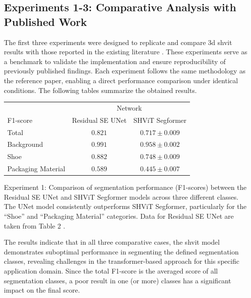 \subsection{Experiments 1-3: Comparative Analysis with Published Work}
The first three experiments were designed to replicate and compare \gls{3d} \gls{shvit} results with those reported in the existing literature \cite{contribution_martin_leipert}. These experiments serve as a benchmark to validate the implementation and ensure reproducibility of previously published findings. Each experiment follows the same methodology as the reference paper, enabling a direct performance comparison under identical conditions. The following tables summarize the obtained results.

\begin{center}
	\begin{threeparttable}[H]
		\begin{tabular}{lcc}
			\toprule[1.5pt]  
			& \multicolumn{2}{c}{Network} \\
			\multicolumn{1}{l}{F1-score} & {Residual SE UNet} & {SHViT Segformer} \\
			\midrule
			\midrule
			Total              & $0.821$ & $0.717 \pm 0.009$ \\
			\midrule
			Background         & $0.991$ & $0.958 \pm 0.002$ \\
			Shoe               & $0.882$ & $0.748 \pm 0.009$ \\
			Packaging Material & $0.589$ & $0.445 \pm 0.007$ \\
			\bottomrule
		\end{tabular}
		\captionsetup{width=0.95\textwidth}
		\caption[Comparison of segmentation performance (F1-scores) between the Residual SE UNet and SHViT Segformer models across three different classes]{Experiment 1: Comparison of segmentation performance (F1-scores) between the Residual SE UNet and SHViT Segformer models across three different classes. The UNet model consistently outperforms SHViT Segformer, particularly for the \enquote{Shoe} and \enquote{Packaging Material} categories. Data for Residual SE UNet are taken from Table 2 \cite{contribution_martin_leipert}.}
		\label{tab:paper_3_segments}
	\end{threeparttable}
\end{center}

The results indicate that in all three comparative cases, the \gls{shvit} model demonstrates suboptimal performance in segmenting the defined segmentation classes, revealing challenges in the transformer-based approach for this specific application domain. Since the total F1-score is the averaged score of all segmentation classes, a poor result in one (or more) classes has a significant impact on the final score. 

